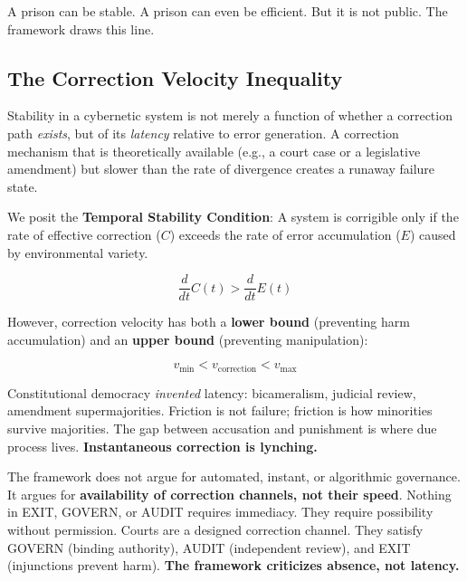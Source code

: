 \documentclass{article}
\begin{document}
A prison can be stable. A prison can even be efficient. But it is not public. The framework draws this line.

\subsection{The Correction Velocity Inequality}
\label{subsec:velocity}

Stability in a cybernetic system is not merely a function of whether a correction path \textit{exists}, but of its \textit{latency} relative to error generation. A correction mechanism that is theoretically available (e.g., a court case or a legislative amendment) but slower than the rate of divergence creates a runaway failure state.

We posit the \textbf{Temporal Stability Condition}: A system is corrigible only if the rate of effective correction ($C$) exceeds the rate of error accumulation ($E$) caused by environmental variety.

\begin{equation}
\frac{d}{dt} C(t) > \frac{d}{dt} E(t)
\label{eq:velocity-lower}
\end{equation}

However, correction velocity has both a \textbf{lower bound} (preventing harm accumulation) and an \textbf{upper bound} (preventing manipulation):

\begin{equation}
v_{\min} < v_{\text{correction}} < v_{\max}
\label{eq:velocity-bounds}
\end{equation}

\begin{clarification}[title=Velocity Bounds]
Constitutional democracy \textit{invented} latency: bicameralism, judicial review, amendment supermajorities. Friction is not failure; friction is how minorities survive majorities. The gap between accusation and punishment is where due process lives. \textbf{Instantaneous correction is lynching.}

The framework does not argue for automated, instant, or algorithmic governance. It argues for \textbf{availability of correction channels, not their speed}. Nothing in EXIT, GOVERN, or AUDIT requires immediacy. They require possibility without permission. Courts are a designed correction channel. They satisfy GOVERN (binding authority), AUDIT (independent review), and EXIT (injunctions prevent harm). \textbf{The framework criticizes absence, not latency.}
\end{clarification}
\end{document}
